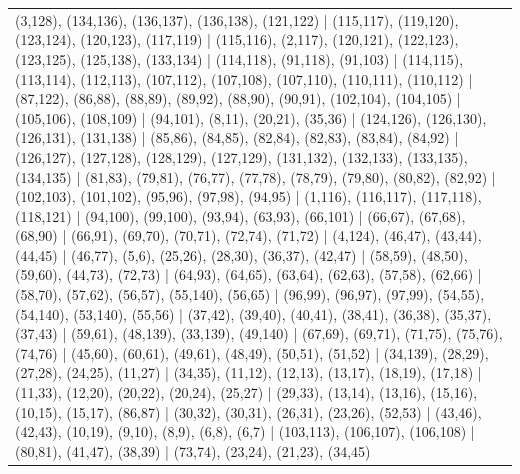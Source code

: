 \begin{longtable}{lrrrl}
\multicolumn{5}{p{0.96\linewidth}}{\tiny\raggedright\arraybackslash (3,128), (134,136), (136,137), (136,138), (121,122) | (115,117), (119,120), (123,124), (120,123), (117,119) | (115,116), (2,117), (120,121), (122,123), (123,125), (125,138), (133,134) | (114,118), (91,118), (91,103) | (114,115), (113,114), (112,113), (107,112), (107,108), (107,110), (110,111), (110,112) | (87,122), (86,88), (88,89), (89,92), (88,90), (90,91), (102,104), (104,105) | (105,106), (108,109) | (94,101), (8,11), (20,21), (35,36) | (124,126), (126,130), (126,131), (131,138) | (85,86), (84,85), (82,84), (82,83), (83,84), (84,92) | (126,127), (127,128), (128,129), (127,129), (131,132), (132,133), (133,135), (134,135) | (81,83), (79,81), (76,77), (77,78), (78,79), (79,80), (80,82), (82,92) | (102,103), (101,102), (95,96), (97,98), (94,95) | (1,116), (116,117), (117,118), (118,121) | (94,100), (99,100), (93,94), (63,93), (66,101) | (66,67), (67,68), (68,90) | (66,91), (69,70), (70,71), (72,74), (71,72) | (4,124), (46,47), (43,44), (44,45) | (46,77), (5,6), (25,26), (28,30), (36,37), (42,47) | (58,59), (48,50), (59,60), (44,73), (72,73) | (64,93), (64,65), (63,64), (62,63), (57,58), (62,66) | (58,70), (57,62), (56,57), (55,140), (56,65) | (96,99), (96,97), (97,99), (54,55), (54,140), (53,140), (55,56) | (37,42), (39,40), (40,41), (38,41), (36,38), (35,37), (37,43) | (59,61), (48,139), (33,139), (49,140) | (67,69), (69,71), (71,75), (75,76), (74,76) | (45,60), (60,61), (49,61), (48,49), (50,51), (51,52) | (34,139), (28,29), (27,28), (24,25), (11,27) | (34,35), (11,12), (12,13), (13,17), (18,19), (17,18) | (11,33), (12,20), (20,22), (20,24), (25,27) | (29,33), (13,14), (13,16), (15,16), (10,15), (15,17), (86,87) | (30,32), (30,31), (26,31), (23,26), (52,53) | (43,46), (42,43), (10,19), (9,10), (8,9), (6,8), (6,7) | (103,113), (106,107), (106,108) | (80,81), (41,47), (38,39) | (73,74), (23,24), (21,23), (34,45)} \\[2pt]
\end{longtable}
\endgroup